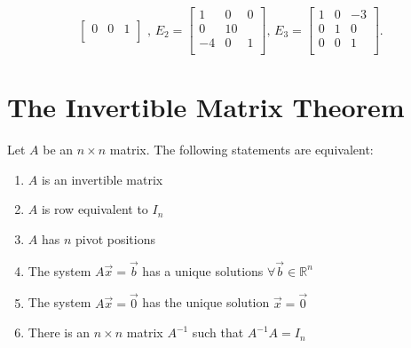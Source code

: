 \documentclass[../main.tex]{subfiles}
\begin{document}
{\begin{enumerate} [label=(\alph*)]
\[\begin{bmatrix}
          0 & 0 & 1\\
          \end{bmatrix} \text{ , } E_2= \begin{bmatrix}
          1 & 0 & 0\\
          0 &1  0& \\
          -4 & 0 & 1\\
          \end{bmatrix} \text{, } E_3 = \begin{bmatrix}
          1 & 0 & -3\\
          0 & 1 & 0\\
          0 &0  &1 \\
          \end{bmatrix}
          .\] 
  \end{enumerate}
  
}

\section{The Invertible Matrix Theorem}
Let $A $ be an $n \times n$ matrix. The following statements are equivalent:
\begin{enumerate} [label=(\alph*)]
  \item $A$ is an invertible matrix
  \item $A$ is row equivalent to $I_n$
  \item $A$ has $n$ pivot positions
  \item The system $A \vec{x} = \vec{b} $ has a unique solutions $\forall \vec{b} \in \mathbb{R}^{n}$
  \item The system $A \vec{x} = \vec{0} $ has the unique solution $\vec{x} =\vec{0} $ 
  \item There is an $n \times n$ matrix $A^{-1}$ such that $A^{-1}A =I_n$
  \end{enumerate}
\end{document}

